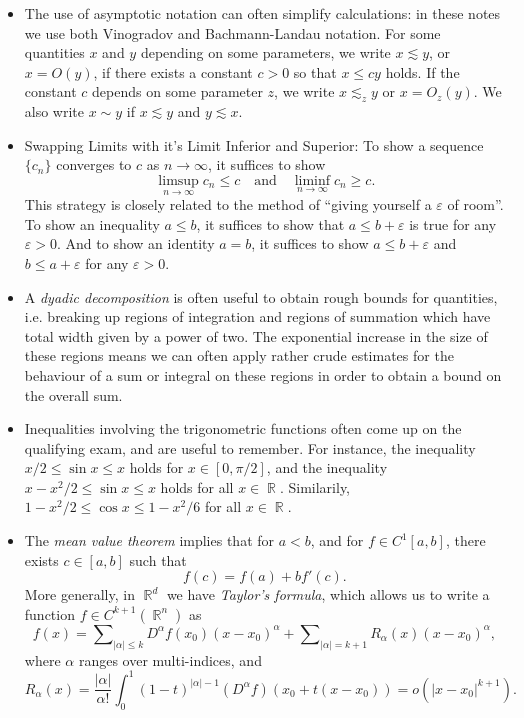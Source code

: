 \documentclass[answers]{exam}
\DeclareMathOperator{\RR}{\mathbb{R}}
\begin{document}
\begin{itemize}
	\item The use of asymptotic notation can often simplify calculations: in these notes we use both Vinogradov and Bachmann-Landau notation. For some quantities $x$ and $y$ depending on some parameters, we write $x \lesssim y$, or $x = O(y)$, if there exists a constant $c > 0$ so that $x \leq c y$ holds. If the constant $c$ depends on some parameter $z$, we write $x \lesssim_z y$ or $x = O_z(y)$. We also write $x \sim y$ if $x \lesssim y$ and $y \lesssim x$.

	\item Swapping Limits with it's Limit Inferior and Superior: To show a sequence $\{ c_n \}$ converges to $c$ as $n \to \infty$, it suffices to show
	\[ \limsup_{n \to \infty} c_n \leq c \quad\text{and}\quad \liminf_{n \to \infty} c_n \geq c. \]
	This strategy is closely related to the method of ``giving yourself a $\varepsilon$ of room''. To show an inequality $a \leq b$, it suffices to show that $a \leq b + \varepsilon$ is true for any $\varepsilon > 0$. And to show an identity $a = b$, it suffices to show $a \leq b + \varepsilon$ and $b \leq a + \varepsilon$ for any $\varepsilon > 0$.

	\item A \emph{dyadic decomposition} is often useful to obtain rough bounds for quantities, i.e. breaking up regions of integration and regions of summation which have total width given by a power of two. The exponential increase in the size of these regions means we can often apply rather crude estimates for the behaviour of a sum or integral on these regions in order to obtain a bound on the overall sum.

	\item Inequalities involving the trigonometric functions often come up on the qualifying exam, and are useful to remember. For instance, the inequality $x/2 \leq \sin x \leq x$ holds for $x \in [0,\pi/2]$, and the inequality $x - x^2/2 \leq \sin x \leq x$ holds for all $x \in \RR$. Similarily, $1 - x^2/2 \leq \cos x \leq 1 - x^2/6$ for all $x \in \RR$.

	\item The \emph{mean value theorem} implies that for $a < b$, and for $f \in C^1[a,b]$, there exists $c \in [a,b]$ such that
	\[ f(c) = f(a) + b f'(c). \]
	More generally, in $\RR^d$ we have \emph{Taylor's formula}, which allows us to write a function $f \in C^{k+1}(\RR^n)$ as
	\[ f(x) = \sum\nolimits_{|\alpha| \leq k} D^\alpha f(x_0) (x - x_0)^\alpha + \sum\nolimits_{|\alpha| = k+1} R_\alpha(x) (x - x_0)^\alpha, \]
	where $\alpha$ ranges over multi-indices, and
	\[ R_\alpha(x) = \frac{|\alpha|}{\alpha!} \int_0^1 (1 - t)^{|\alpha|-1} (D^\alpha f)(x_0 + t(x - x_0)) = o(|x - x_0|^{k+1}). \]


\end{itemize}
\end{document}
